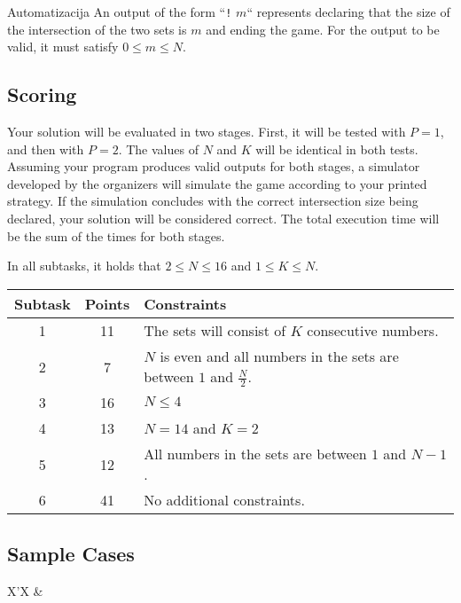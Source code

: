 \begin{statement}[
  problempoints=100,
  timelimit=6 seconds,
  memorylimit=512 MiB,
]{Automatizacija}
An output of the form “\texttt{!} $m$“ represents declaring that the size of the intersection 
of the two sets is $m$ and ending the game.  
For the output to be valid, it must satisfy $0 \leq m \leq N$.

\subsection*{Scoring}

Your solution will be evaluated in two stages.  
First, it will be tested with $P = 1$, and then with $P = 2$.  
The values of $N$ and $K$ will be identical in both tests.  
Assuming your program produces valid outputs for both stages, 
a simulator developed by the organizers will simulate the game according to your printed strategy.  
If the simulation concludes with the correct intersection size being declared, your solution 
will be considered correct.  
The total execution time will be the sum of the times for both stages.

In all subtasks, it holds that $2 \leq N \leq 16$ and $1 \leq K \leq N$.

{\renewcommand{\arraystretch}{1.4}
  \setlength{\tabcolsep}{6pt}
  \begin{tabular}{ccl}
   Subtask & Points & Constraints \\ \midrule
    1 & 11 & The sets will consist of $K$ consecutive numbers. \\
    2 & 7 & $N$ is even and all numbers in the sets are between $1$ and $\frac{N}{2}$. \\
    3 & 16 & $N \leq 4$ \\
    4 & 13 & $N = 14$ and $K = 2$ \\
    5 & 12 & All numbers in the sets are between $1$ and $N-1$. \\
    6 & 41 & No additional constraints.
\end{tabular}}

\subsection*{Sample Cases}
\begin{tabularx}{\textwidth}{X'X}
 &
\end{tabularx}


\end{statement}
